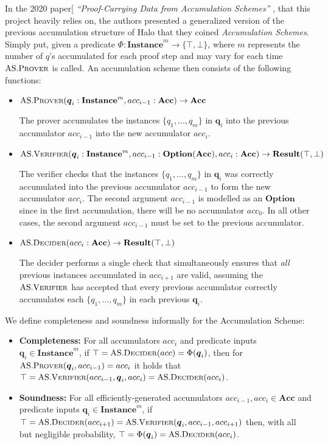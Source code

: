 \documentclass[
]{article}
\renewcommand{\vec}[1]{ \boldsymbol{#1} }
\newcommand*{\Prover}{\mathrm{\text{P\scriptsize ROVER}}}
\newcommand*{\Verifier}{\mathrm{\text{V\scriptsize ERIFIER}}}
\newcommand*{\Decider}{\mathrm{\text{D{\scriptsize ECIDER}}}}
\newcommand*{\AS}{\text{AS}}
\newcommand*{\ASProver}{\AS.\Prover}
\newcommand*{\ASVerifier}{\AS.\Verifier}
\newcommand*{\ASDecider}{\AS.\Decider}
\newcommand*\Result{\mathbf{Result}}
\newcommand*\Option{\mathbf{Option}}
\newcommand*\Acc{\mathbf{Acc}}
\newcommand*\Instance{\mathbf{Instance}}
\begin{document}
In the 2020 paper{[}\citeproc{ref-pcd}{Bünz et al. 2020}{]}
\emph{``Proof-Carrying Data from Accumulation Schemes''} , that this
project heavily relies on, the authors presented a generalized version
of the previous accumulation structure of Halo that they coined
\emph{Accumulation Schemes}. Simply put, given a predicate \(\Phi:
\Instance^m \to \{ \top, \bot \}\), where \(m\) represents the number of
\(q\)'s accumulated for each proof step and may vary for each time
\(\ASProver\) is called. An accumulation scheme then consists of the
following functions:

\begin{itemize}
\item
  \(\ASProver(\vec{q}_i: \Instance^m, acc_{i-1}: \Acc) \to \Acc\)

  The prover accumulates the instances \(\{ q_1, \dots, q_m \}\) in
  \(\vec{q}_i\) into the previous accumulator \(acc_{i-1}\) into the new
  accumulator \(acc_i\).
\item
  \(\ASVerifier(\vec{q}_i: \Instance^m, acc_{i-1}: \Option(\Acc), acc_i: \Acc) \to \Result(\top, \bot)\)

  The verifier checks that the instances \(\{ q_1, \dots, q_m \}\) in
  \(\vec{q}_i\) was correctly accumulated into the previous accumulator
  \(acc_{i-1}\) to form the new accumulator \(acc_i\). The second
  argument \(acc_{i-1}\) is modelled as an \(\Option\) since in the
  first accumulation, there will be no accumulator \(acc_0\). In all
  other cases, the second argument \(acc_{i-1}\) must be set to the
  previous accumulator.
\item
  \(\ASDecider(acc_i: \Acc) \to \Result(\top, \bot)\)

  The decider performs a single check that simultaneously ensures that
  \emph{all} previous instances accumulated in \(acc_{i+1}\) are valid,
  assuming the \(\ASVerifier\) has accepted that every previous
  accumulator correctly accumulates each \(\{ q_1, \dots, q_m \}\) in
  each previous \(\vec{q}_i\).
\end{itemize}

We define completeness and soundness informally for the Accumulation
Scheme:

\begin{itemize}
\item
  \textbf{Completeness:} For all accumulators \(acc_i\) and predicate
  inputs \(\vec{q}_i \in \Instance^m\), if
  \(\top = \ASDecider(acc) = \Phi(\vec{q}_i)\), then for
  \(\ASProver(\vec{q}_i, acc_{i-1}) = acc_i\) it holds that \(\top =
  \ASVerifier(acc_{i-1}, \vec{q}_i, acc_i) = \ASDecider(acc_i)\).
\item
  \textbf{Soundness:} For all efficiently-generated accumulators
  \(acc_{i-1}, acc_i
  \in \Acc\) and predicate inputs \(\vec{q}_i \in \Instance^m\), if
  \(\top = \ASDecider(acc_{i+1}) =
  \ASVerifier(\vec{q}_i, acc_{i-1}, acc_{i+1})\) then, with all but
  negligible probability,
  \(\top = \Phi(\vec{q}_i) = \ASDecider(acc_i)\).
\end{itemize}
\end{document}
